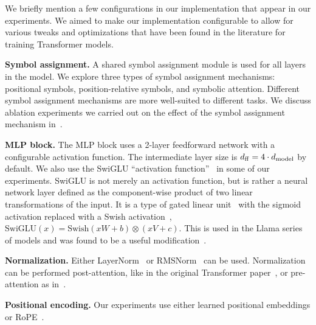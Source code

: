 We briefly mention a few configurations in our implementation that appear in our experiments. We aimed to make our implementation configurable to allow for various tweaks and optimizations that have been found in the literature for training Transformer models.

\textbf{Symbol assignment.} A shared symbol assignment module is used for all layers in the model. We explore three types of symbol assignment mechanisms: positional symbols, position-relative symbols, and symbolic attention. Different symbol assignment mechanisms are more well-suited to different tasks. We discuss ablation experiments we carried out on the effect of the symbol assignment mechanism in~.

\textbf{MLP block.} The MLP block uses a 2-layer feedforward network with a configurable activation function. The intermediate layer size is $d_{\mathrm{ff}} = 4 \cdot d_{\mathrm{model}}$ by default. We also use the SwiGLU ``activation function''~\citep{shazeerGLUVariantsImprove2020} in some of our experiments. SwiGLU is not merely an activation function, but is rather a neural network layer defined as the component-wise product of two linear transformations of the input. It is a type of gated linear unit~\citep{dauphin2017language} with the sigmoid activation replaced with a Swish activation~\citep{hendrycks2016gaussian}, $\mathrm{SwiGLU}(x) = \mathrm{Swish}(x W + b) \otimes (x V + c)$. This is used in the Llama series of models and was found to be a useful modification~\citep{touvronLlamaOpenFoundation2023}.

\textbf{Normalization.} Either LayerNorm~\citep{ba2016layer} or RMSNorm~\citep{zhang2019root} can be used. Normalization can be performed post-attention, like in the original Transformer paper~\citep{vaswani2017attention}, or pre-attention as in~\citep{xiong2020layer}.

\textbf{Positional encoding.} Our experiments use either learned positional embeddings or RoPE~\citep{suRoFormerEnhancedTransformer2023}.

